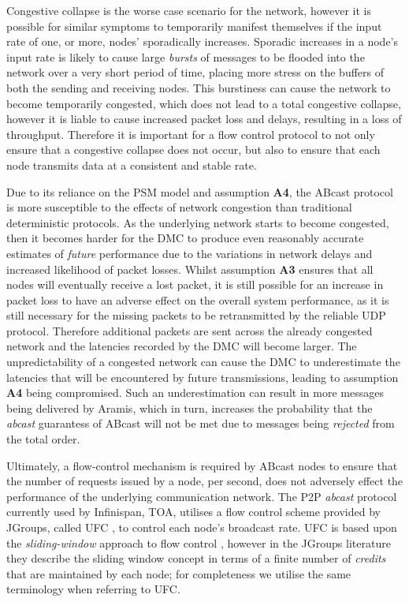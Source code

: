 Congestive collapse is the worse case scenario for the network, however it is possible for similar symptoms to temporarily manifest themselves if the input rate of one, or more, nodes' sporadically increases.  Sporadic increases in a node's input rate is likely to cause large \emph{bursts} of messages to be flooded into the network over a very short period of time, placing more stress on the buffers of both the sending and receiving nodes.  This burstiness can cause the network to become temporarily congested, which does not lead to a total congestive collapse, however it is liable to cause increased packet loss and delays, resulting in a loss of throughput.  Therefore it is important for a flow control protocol to not only ensure that a congestive collapse does not occur, but also to ensure that each node transmits data at a consistent and stable rate.  

Due to its reliance on the PSM model and assumption \textbf{A4}, the \textsf{ABcast} protocol is more susceptible to the effects of network congestion than traditional deterministic protocols.  As the underlying network starts to become congested, then it becomes harder for the DMC to produce even reasonably accurate estimates of \emph{future} performance due to the variations in network delays and increased likelihood of packet losses.  Whilst assumption \textbf{A3} ensures that all nodes will eventually receive a lost packet, it is still possible for an increase in packet loss to have an adverse effect on the overall system performance, as it is still necessary for the missing packets to be retransmitted by the reliable UDP protocol.  Therefore additional packets are sent across the already congested network and the latencies recorded by the DMC will become larger.  The unpredictability of a congested network can cause the DMC to underestimate the latencies that will be encountered by future transmissions, leading to assumption \textbf{A4} being compromised.  Such an underestimation can result in more messages being delivered by \textsf{Aramis}, which in turn, increases the probability that the \emph{abcast} guarantess of \textsf{ABcast} will not be met due to messages being \emph{rejected} from the total order.  

Ultimately, a flow-control mechanism is required by \textsf{ABcast} nodes to ensure that the number of requests issued by a node, per second, does not adversely effect the performance of the underlying communication network.  The P2P \emph{abcast} protocol currently used by Infinispan, TOA, utilises a flow control scheme provided by JGroups, called \textsf{UFC} \citep{JGroupsUFC}, to control each node's broadcast rate.  \textsf{UFC} is based upon the \emph{sliding-window} approach to flow control \citep{bertsekas1992DataNetworksFC}, however in the JGroups literature they describe the sliding window concept in terms of a finite number of \emph{credits} that are maintained by each node; for completeness we utilise the same terminology when referring to \textsf{UFC}.  

